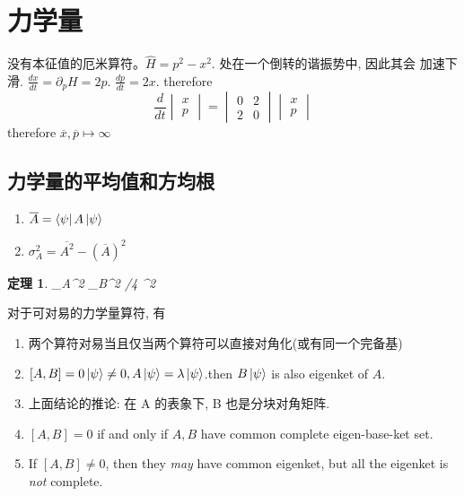 \documentclass{ctexart}
\author{jia}
\newtheorem{theorem}{定理}[section]
\begin{document}
 

\section{力学量}

没有本征值的厄米算符。$\hat{H} = p^2 - x^2$. 处在一个倒转的谐振势中, 因此其会
加速下滑. $\frac{dx}{dt} = \partial_p H = 2p$. $\frac{dp}{dt} = 2x$. 
therefore 
$$
\frac{d}{dt} 
\begin{vmatrix} 
	x \\ p
\end{vmatrix}
= 
\begin{vmatrix } 
	0 & 2 \\ 2 & 0 	
\end{vmatrix }
\begin{vmatrix} 
	x \\ p	
\end{vmatrix}
$$
therefore $\overline{x}, \overline{p} \mapsto \infty$
\subsection{力学量的平均值和方均根} 

\begin{enumerate}
	\item $\overline{A}=\bra{\psi}A\ket{\psi}$
	\item $\sigma_A^2 = \overline{A^2} - (\overline{A})^2$
\end{enumerate}

\begin{theorem}
	\sigma_A^2 \sigma_B^2 /4 \langle [A,B]\rangle^2 
\end{theorem}

对于可对易的力学量算符, 有

\begin{enumerate} 
	\item 两个算符对易当且仅当两个算符可以直接对角化(或有同一个完备基)
	\item $[A,B]=0 \ket{\psi}\ne 0, A\ket{\psi}=\lambda\ket{\psi}$.then $B\ket{\psi}$ is also eigenket of $A$. 
	
	\item 上面结论的推论: 在 A 的表象下, B 也是分块对角矩阵. 
	\item $[A,B]=0$ if and only if $A, B$ have common complete eigen-base-ket set. 
	\item If $[A,B]\ne 0$, then they {\em may} have common eigenket, but all the eigenket is {\em not} complete. 
\end{enumerate}
\end{document}
